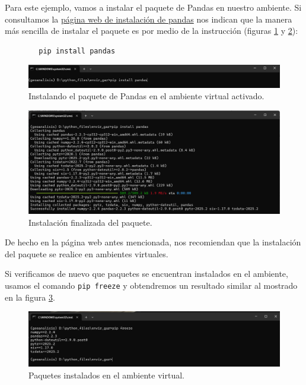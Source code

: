 \documentclass{article}
\begin{document}
	Para este ejemplo, vamos a instalar el paquete de Pandas en nuestro ambiente. Si consultamos la \href{https://pandas.pydata.org/pandas-docs/stable/getting_started/install.html}{página web de instalación de pandas} nos indican que la manera más sencilla de instalar el paquete es por medio de la instrucción (figuras \ref{fig:figura09} y \ref{fig:figura10}):
	\begin{verbatim}
		pip install pandas
	\end{verbatim} 
	
	\begin{figure}[H]
		\centering
		\includegraphics[width=0.9\linewidth]{Figura09}
		\caption{Instalando el paquete de Pandas en el ambiente virtual activado.}
		\label{fig:figura09}
	\end{figure}
	
	\begin{figure}[H]
		\centering
		\includegraphics[width=0.9\linewidth]{Figura10}
		\caption{Instalación finalizada del paquete.}
		\label{fig:figura10}
	\end{figure}
	
	De hecho en la página web antes mencionada, nos recomiendan que la instalación del paquete se realice en ambientes virtuales.\bigskip
	
	Si verificamos de nuevo que paquetes se encuentran instalados en el ambiente, usamos el comando \texttt{pip freeze} y obtendremos un resultado similar al mostrado en la figura \ref{fig:figura11}.
	
	\begin{figure}[H]
		\centering
		\includegraphics[width=0.9\linewidth]{Figura11}
		\caption{Paquetes instalados en el ambiente virtual.}
		\label{fig:figura11}
	\end{figure}
	
\end{document}
